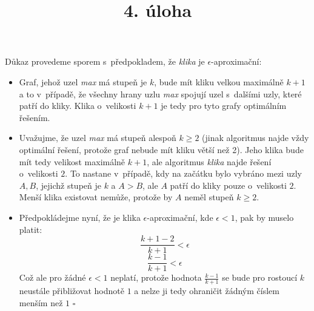 \documentclass[a4paper]{article}
\title {4. úloha}
\begin{document}
\section*{}
Důkaz provedeme sporem s~předpokladem, že \emph{klika} je $\epsilon$-aproximační:
\begin{itemize}
    \item Graf, jehož uzel \emph{max} má stupeň je $k$, bude mít kliku velkou maximálně $k+1$ a to v~případě,
    že všechny hrany uzlu \emph{max} spojují uzel s~dalšími uzly, které patří do kliky.
    Klika o~velikosti $k+1$ je tedy pro tyto grafy optimálním řešením.
    \item Uvažujme, že uzel \emph{max} má stupeň alespoň $k \geq 2$ (jinak algoritmus najde vždy optimální řešení, protože
    graf nebude mít kliku větší než 2).
    Jeho klika bude mít tedy velikost maximálně $k+1$,
    ale algoritmus \emph{klika} najde řešení o~velikosti $2$.
    To nastane v~případě, kdy na začátku bylo vybráno mezi uzly $A,B$, jejichž stupeň je $k$ a $A>B$,
    ale $A$ patří do kliky pouze o~velikosti $2$.
    Menší klika existovat nemůže, protože by $A$ neměl stupeň $k \geq 2$.
    \item Předpokládejme nyní, že je klika $\epsilon$-aproximační, kde $\epsilon <1$, pak by muselo platit:
    $$ \frac{k+1-2}{k+1} < \epsilon$$
    $$ \frac{k-1}{k+1} < \epsilon$$
    Což ale pro žádné $\epsilon < 1$ neplatí, protože hodnota $\frac{k-1}{k+1}$ se bude pro rostoucí $k$
    neustále přibližovat hodnotě $1$ a nelze ji tedy ohraničit žádným číslem menším než $1$ $\square$
\end{itemize}
\end{document}
